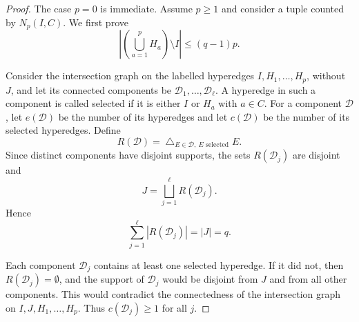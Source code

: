 \documentclass[11pt]{article}
\begin{document}
\begin{proof}
  The case $p=0$ is immediate.  Assume $p\geq1$ and consider a tuple counted by
  $N_p(I,C)$.
  We first prove
  \begin{equation}\label{eq:outside-union-bound-counting}
    \left|
      \left(\bigcup_{a=1}^p H_a\right)\setminus I
    \right|
    \leq
    (q-1)p.
  \end{equation}

  Consider the intersection graph on the labelled hyperedges
  $I,H_1,\ldots,H_p$, without $J$, and let its connected components be
  $\mathcal D_1,\ldots,\mathcal D_\ell$.  A hyperedge in such a component is
  called selected if it is either $I$ or $H_a$ with $a\in C$.  For a component
  $\mathcal D$, let $e(\mathcal D)$ be the number of its hyperedges and let
  $c(\mathcal D)$ be the number of its selected hyperedges.  Define
  \begin{equation}\label{eq:R-D-def}
    R(\mathcal D)
    =
    \bigtriangleup_{E\in\mathcal D,\ E\text{ selected}}E.
  \end{equation}
  Since distinct components have disjoint supports, the sets
  $R(\mathcal D_j)$ are disjoint and
  \begin{equation}\label{eq:J-disjoint-union-RD}
    J
    =
    \bigsqcup_{j=1}^\ell R(\mathcal D_j).
  \end{equation}
  Hence
  \begin{equation}\label{eq:sum-RD-q}
    \sum_{j=1}^\ell |R(\mathcal D_j)|=|J|=q.
  \end{equation}

  Each component $\mathcal D_j$ contains at least one selected hyperedge.  If it
  did not, then $R(\mathcal D_j)=\emptyset$, and the support of
  $\mathcal D_j$ would be disjoint from $J$ and from all other components.
  This would contradict the connectedness of the intersection graph on
  $I,J,H_1,\ldots,H_p$.  Thus $c(\mathcal D_j)\geq1$ for all $j$.


\end{proof}
\end{document}
